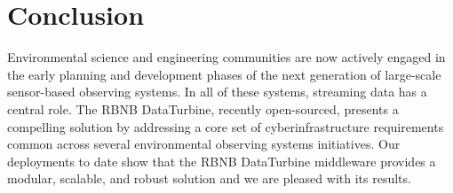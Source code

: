\section{Conclusion}\label{sec:conclusion}


Environmental science and engineering communities are now actively engaged in the early planning and development phases of the next generation of large-scale sensor-based observing systems.  In all of these systems, streaming data has a central role. The RBNB DataTurbine, recently open-sourced, presents a compelling solution by addressing a core set of cyberinfrastructure requirements common across several environmental observing systems initiatives. 
Our deployments to date show that the RBNB DataTurbine middleware provides a modular, scalable, and robust solution and we are pleased with its results.


